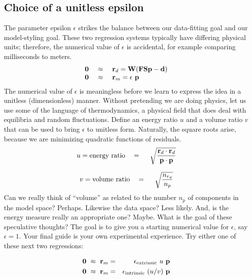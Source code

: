 \subsection{Choice of a unitless epsilon}
The parameter epsilon $\epsilon$ strikes the balance between
our data-fitting goal and our model-styling goal.
These two regression systems typically have differing physical units;
therefore, the numerical value of $\epsilon$ is accidental,
for example comparing milliseconds to meters.
\begin{equation}
\label{eqn:epsilonstory}
\begin{array}{rcl}
\bold 0 \ &\approx&\   \bold r_d = \bold W (\bold F\bold S \bold p -\bold d)
\\
\bold 0 \ &\approx&\   \bold r_m = \epsilon \  \bold p
\end{array}\end{equation}
The numerical value of $\epsilon$ is meaningless before
we learn to express the idea in a unitless (dimensionless) manner.
Without pretending we are doing physics,
let us use some of the language of thermodynamics,
a physical field that does deal with equilibria and random fluctuations.
Define an energy ratio $u$ and a volume ratio $v$ that can
be used to bring $\epsilon$ to unitless form.
Naturally, the square roots arise,
because we are minimizing quadratic functions of residuals.
$$
u = {\rm energy\ ratio} \quad=\quad \ \sqrt{
                           \frac{\bold r_d\cdot \bold r_d}
			        {\bold p\cdot\bold p}
			   }
$$

$$
v = {\rm volume\ ratio} \quad=\quad \ \sqrt{
			    \frac{n_{r_d}}{n_p}
			   }
$$
Can we really think of ``volume'' as related to
the number $n_p$ of components in the model space?  Perhaps.
Likewise the data space?  Less likely.
And, is the energy measure really an appropriate one?
Maybe.
What is the goal of these speculative thoughts?
The goal is to give you a starting numerical value for $\epsilon$,
say $\epsilon=1$.
Your final guide is your own experimental experience.
Try either one of these next two regressions:

\begin{eqnarray}
\bold 0 \ \approx \ 
\bold r_m &=& \epsilon_{\rm extrinsic} \ u \ \bold p
\\
\bold 0 \ \approx \ 
\bold r_m &=& \epsilon_{\rm intrinsic}\ (u/v) \ \bold p
\end{eqnarray}



